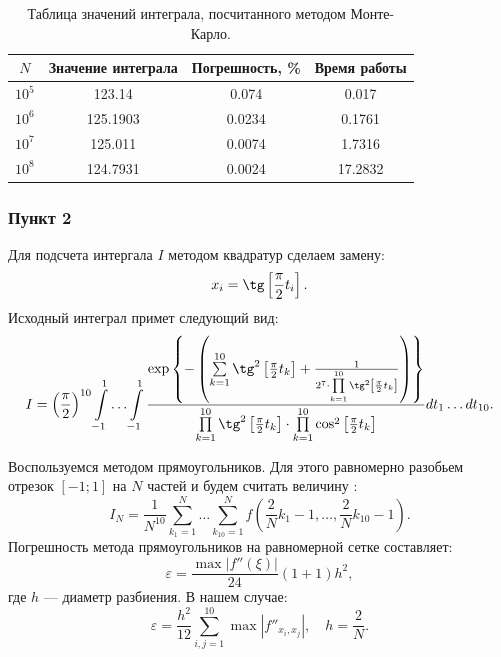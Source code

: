 \documentclass[oneside, final, 12pt]{article}
\begin{document}
	\begin{table}[h!]
	\begin{center}
		\begin{tabular}{|c|c|c|c|}
			\hline $N$ & Значение интеграла & Погрешность, \% & Время работы    \\ \hline
				$10^5$ & 123.14 & 0.074 & 0.017 \\ \hline
				$10^6$ & 125.1903 & 0.0234 & 0.1761 \\ \hline
				$10^7$ & 125.011 & 0.0074 & 1.7316 \\ \hline
				$10^8$ & 124.7931 & 0.0024 & 17.2832 \\ \hline
		\end{tabular}
		\caption{ \centering  Таблица значений интеграла, посчитанного методом Монте-Карло.}
	\end{center}
	\end{table}

\subsubsection{Пункт 2}
	Для подсчета интергала $I$ методом квадратур сделаем замену:
	$$
		x_i = \tg\left[ \dfrac{\pi}{2}t_i\right].
	$$
	Исходный интеграл примет следующий вид:
	$$ 
		I = \left( \dfrac{\pi}{2}\right)^{10}  \int\limits_{-1}^{1} \ldots \int\limits_{-1}^{1}
				\dfrac{ \exp\left\{ - \left( \sum\limits_{k=1}^{10}  \tg^2\left[ \frac{\pi}{2}t_k\right] +
														\frac{1}{2^7 \cdot \prod\limits_{k=1}^{10} \tg^2\left[ \frac{\pi}{2}t_k\right]}
											\right) \right\}}
						{\prod\limits_{k=1}^{10} \tg^2\left[ \frac{\pi}{2}t_k\right]\cdot
						 \prod\limits_{k=1}^{10} \cos^2\left[\frac{\pi}{2}t_k\right]} dt_1 \ldots d t_{10}.
	$$
	
	Воспользуемся методом прямоугольников. Для этого равномерно разобьем отрезок $[-1;1]$ на $N$ частей
	и будем считать величину :
	$$
		I_N = \dfrac{1}{N^{10}}\sum\limits_{k_1=1}^{N}\ldots \sum\limits_{k_{10}=1}^{N}
			f\left( \dfrac{2}{N}k_1-1, \ldots, \dfrac{2}{N}k_{10}-1 \right).
	$$ 
	Погрешность метода прямоугольников на равномерной сетке составляет:
	$$
		\varepsilon = \dfrac{\max|f''(\xi)|}{24}(1+1)h^2, 
	$$
	где $h$ --- диаметр разбиения. В нашем случае:
	$$
		\varepsilon = \dfrac{h^2}{12}\sum\limits_{i,j=1}^{10}\max\left|f''_{x_i,x_j}\right|, \quad h = \dfrac{2}{N}.
	$$
	
\end{document}
